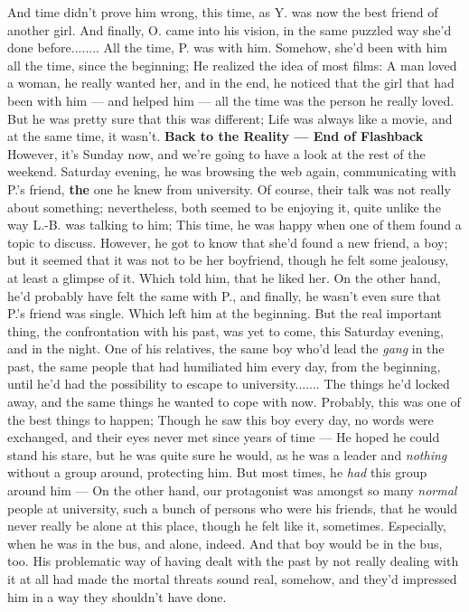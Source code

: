 And time didn't prove him wrong, this time, as Y. was now the best friend of another girl. 
And finally, O. came into his vision, in the same puzzled way she'd done before........
All the time, P. was with him. Somehow, she'd been with him all the time, since the beginning; He realized the idea of most films: A man loved a woman, he really wanted her, and in the end, he noticed that the girl that had been with him --- and helped him --- all the time was the person he really loved. 
But he was pretty sure that this was different; Life was always like a movie, and at the same time, it wasn't. 
\textbf{Back to the Reality --- End of Flashback}
However, it's Sunday now, and we're going to have a look at the rest of the weekend. Saturday evening, he was browsing the web again, communicating with P.'s friend, \textbf{the} one he knew from university. Of course, their talk was not really about something; nevertheless, both seemed to be enjoying it, quite unlike the way L.-B. was talking to him; This time, he was happy when one of them found a topic to discuss. However, he got to know that she'd found a new friend, a boy; but it seemed that it was not to be her boyfriend, though he felt some jealousy, at least a glimpse of it. Which told him, that he liked her. On the other hand, he'd probably have felt the same with P., and finally, he wasn't even sure that P.'s friend was single. 
Which left him at the beginning. 
But the real important thing, the confrontation with his past, was yet to come, this Saturday evening, and in the night. One of his relatives, the same boy who'd lead the \emph{gang} in the past, the same people that had humiliated him every day, from the beginning, until he'd had the possibility to escape to university.......
The things he'd locked away, and the same things he wanted to cope with now. Probably, this was one of the best things to happen; Though he saw this boy every day, no words were exchanged, and their eyes never met since years of time --- He hoped he could stand his stare, but he was quite sure he would, as he was a leader and \emph{nothing} without a group around, protecting him. 
But most times, he \emph{had} this group around him --- On the other hand, our protagonist was amongst so many \emph{normal} people at university, such a bunch of persons who were his friends, that he would never really be alone at this place, though he felt like it, sometimes. 
Especially, when he was in the bus, and alone, indeed. 
And that boy would be in the bus, too. 
His problematic way of having dealt with the past by not really dealing with it at all had made the mortal threats sound real, somehow, and they'd impressed him in a way they shouldn't have done. 
